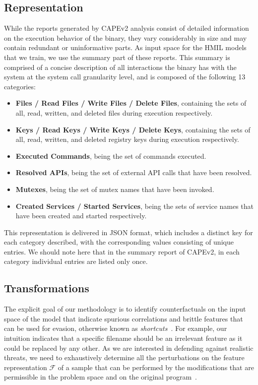 \subsection{Representation}
\label{sec:representation}
While the reports generated by CAPEv2 analysis consist of detailed information on the execution behavior of the binary, they vary considerably in size and may contain redundant or uninformative parts. 
As input space for the HMIL models that we train, we use the summary part of these reports.
This summary is comprised of a concise description of all interactions the binary has with the system at the system call granularity level, and is composed of the following 13 categories:
\begin{itemize}
    \item \textbf{Files / Read Files / Write Files / Delete Files}, containing the sets of all, read, written, and deleted files during execution respectively.
    \item \textbf{Keys / Read Keys / Write Keys / Delete Keys}, containing the sets of all, read, written, and deleted registry keys during execution respectively.
    \item \textbf{Executed Commands}, being the set of commands executed.
    \item \textbf{Resolved APIs}, being the set of external API calls that have been resolved.
    \item \textbf{Mutexes}, being the set of mutex names that have been invoked.
    \item \textbf{Created Services / Started Services}, being the sets of service names that have been created and started respectively.
\end{itemize}

This representation is delivered in JSON format, which includes a distinct key for each category described, with the corresponding values consisting of unique entries.
We should note here that in the summary report of CAPEv2, in each category individual entries are listed only once.

\subsection{Transformations}
\label{sec:trans}
The explicit goal of our methodology is to identify counterfactuals on the input space of the model that indicate spurious correlations and brittle features that can be used for evasion, otherwise known as \textit{shortcuts}~\cite{geirhos2018generalisation}.
For example, our intuition indicates that a specific filename should be an irrelevant feature as it could be replaced by any other.
As we are interested in defending against realistic threats, we need to exhaustively determine all the perturbations on the feature representation $\mathcal{F}$ of a sample that can be performed by the modifications that are permissible in the problem space and on the original program~\cite{pierazzi2020intriguing}.


